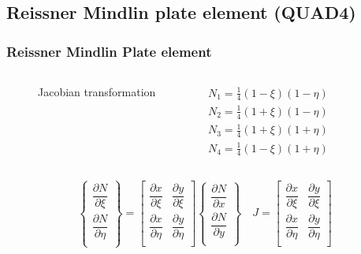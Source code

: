 \documentclass[9pt]{beamer}
\begin{document}
\subsection{Reissner Mindlin plate element (QUAD4)}
\begin{frame}\frametitle{Reissner Mindlin Plate element}

\begin{columns}
\begin{figure}[h!]
\centering


\caption{Jacobian transformation} 
\label{fig:JacTrans_quad}
\end{figure}




 
\begin{equation*}\label{eq:MITC4_SF}
\begin{split}
N_1  =\frac{1}{4}(1-\xi)(1 -\eta)
\\
N_2=\frac{1}{4}(1+\xi)(1-\eta) 
 \\
N_3  =\frac{1}{4}(1+\xi)(1+ \eta)
 \\
N_4 =\frac{1}{4}(1-\xi)(1+\eta)\end{split}
\end{equation*}
\end{columns}

\begin{equation}
\left\{
\begin{array}{r}
\dfrac{\partial N }{ \partial \xi }  \\
\dfrac{\partial N }{ \partial \eta }  \\
\end{array}
\right\}
=
\begin{bmatrix}
\dfrac{ \partial x }{\partial \xi }   &
\dfrac{ \partial y }{\partial \xi } \\
\dfrac{ \partial x }{\partial \eta }   &
\dfrac{ \partial y }{\partial \eta } \\
\end{bmatrix}
\left\{
\begin{array}{r}
\dfrac{\partial N }{ \partial x }  \\
\dfrac{\partial N }{ \partial y }  \\
\end{array}
\right\}
\quad
J=\begin{bmatrix}
\dfrac{ \partial x }{\partial \xi }   &
\dfrac{ \partial y }{\partial \xi } \\
\dfrac{ \partial x }{\partial \eta }   &
\dfrac{ \partial y }{\partial \eta } \\
\end{bmatrix}
\end{equation}



\end{frame}
\end{document}
